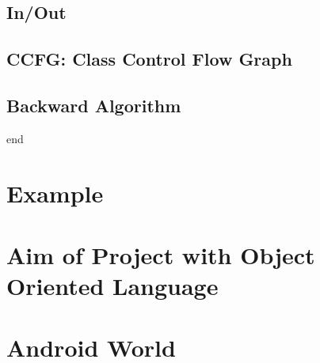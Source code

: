 \documentclass[letterpaper,twocolumn,10pt]{article}
\begin{document}
\subsection{In/Out}

\subsection{CCFG: Class Control Flow Graph}

\subsection{Backward Algorithm}
end\\



\section{Example}
\paragraph{}



\section{Aim of Project with Object Oriented Language}
\paragraph{}



\section{Android World}
\paragraph{}
\end{document}
